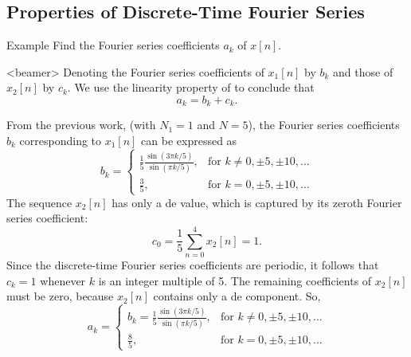 \subsection{Properties of Discrete-Time Fourier Series}


\begin{frame}{Example}
    Find the Fourier series coefficients $a_k$ of $x[n]$.
    \begin{figure}
        \centering
        
    \end{figure}
\end{frame}


\begin{frame}<beamer>
        Denoting the Fourier series coefficients of $x_1[n]$ by $b_k$ and those of $x_2[n]$ by $c_k$. We use the linearity property of to conclude that
        \begin{equation*}
            a_k = b_k + c_k.
        \end{equation*}
    \begin{figure}
        \centering
        
    \end{figure}
    \begin{figure}
        \centering
        
    \end{figure}
\end{frame}

\begin{frame}[allowframebreaks]
    {
        From the previous work, (with $N_1 = 1$ and $N = 5$), the Fourier series coefficients $b_k$ corresponding to $x_1[n]$ can be expressed as
        \begin{equation*}
            b_k = \begin{cases}\frac{1}{5}\frac{\sin(3\pi k/5)}{\sin(\pi k/5)}, & \text{for~} k \neq 0, \pm 5, \pm 10, \dots\\\frac{3}{5}, & \text{for~} k = 0, \pm 5, \pm 10, \dots\end{cases}
        \end{equation*}
        \pause
        The sequence $x_2[n]$ has only a de value, which is captured by its zeroth Fourier series coefficient:
        \begin{equation*}
            c_0 = \frac{1}{5}\sum_{n=0}^{4}x_2[n] = 1.
        \end{equation*}
        Since the discrete-time Fourier series coefficients are periodic, it follows that $c_k = 1$ whenever $k$ is an integer multiple of 5. The remaining coefficients of $x_2[n]$ must be zero, because $x_2[n]$ contains only a de component.
        \pause
        So,
        \begin{equation*}
            a_k = \begin{cases}b_k = \frac{1}{5}\frac{\sin(3\pi k/5)}{\sin(\pi k/5)}, & \text{for~} k \neq 0, \pm 5, \pm 10, \dots\\\frac{8}{5}, & \text{for~} k = 0, \pm 5, \pm 10, \dots\end{cases}
        \end{equation*}

    }
\end{frame}

